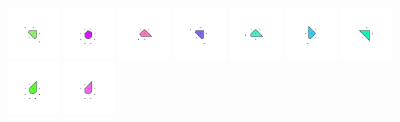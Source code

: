 \documentclass[text.tex]{subfiles}
\begin{document}
\begin{figure}[h!]
\includegraphics[width=0.12\textwidth]{img/results/circle8/circle8_232233_(65_-25alpha_2)_005.pdf}
\includegraphics[width=0.12\textwidth]{img/results/circle8/circle8_232233_(65_-25alpha_2)_006.pdf}
\includegraphics[width=0.12\textwidth]{img/results/circle8/circle8_232233_(65_-25alpha_2)_007.pdf}
\includegraphics[width=0.12\textwidth]{img/results/circle8/circle8_232233_(65_-25alpha_2)_008.pdf}
\includegraphics[width=0.12\textwidth]{img/results/circle8/circle8_232233_(65_-25alpha_2)_009.pdf}
\includegraphics[width=0.12\textwidth]{img/results/circle8/circle8_232233_(65_-25alpha_2)_010.pdf}
\includegraphics[width=0.12\textwidth]{img/results/circle8/circle8_232233_(65_-25alpha_2)_011.pdf}
\includegraphics[width=0.12\textwidth]{img/results/circle8/circle8_232233_(65_-25alpha_2)_012.pdf}
\includegraphics[width=0.12\textwidth]{img/results/circle8/circle8_232233_(65_-25alpha_2)_013.pdf}

\end{figure}
\end{document}
